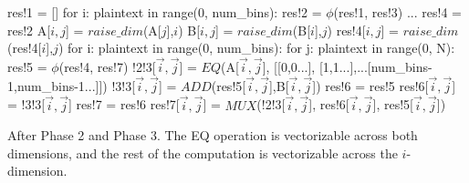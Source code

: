 \documentclass[sigconf, screen, natbib=false, dvipsnames, table]{acmart}
\theoremstyle{definition}
\begin{document}
\begin{algorithmic}
\STATE res!1 = []
\STATE for i: plaintext in range(0, num\_bins):
\STATE \hspace{0.25cm} res!2 = $\phi$(res!1, res!3)
\STATE  \hspace{0.25cm} ...
\STATE res!4 = res!2 
\STATE A[$i,j$] = $\mathit{raise\_dim}$(A[$j$],$i$) 
\STATE B[$i,j$] = $\mathit{raise\_dim}$(B[$i$],$j$) 
\STATE res!4[$i,j$] = $\mathit{raise\_dim}$(res!4[$i$],$j$) 
\STATE for i: plaintext in range(0, num\_bins):
\STATE \hspace{0.25cm}        for j: plaintext in range(0, N):
\STATE \hspace{0.5cm}            res!5 = $\phi$(res!4, res!7) 
\STATE \hspace{0.5cm}            !2!3[$\stackrel{\rightarrow}i,\stackrel{\rightarrow}j$] = $\mathit{EQ}$(A[$\stackrel{\rightarrow}i,\stackrel{\rightarrow}j$], [[0,0...], [1,1...],...[num\_bins-1,num\_bins-1...]])
\STATE \hspace{0.5cm}            !3!3[$\stackrel{\rightarrow}i,\stackrel{\rightarrow}j$] = $\mathit{ADD}$(res!5[$\stackrel{\rightarrow}i,\stackrel{\rightarrow}j$],B[$\stackrel{\rightarrow}i,\stackrel{\rightarrow}j$])
\STATE \hspace{0.5cm}            res!6 = res!5 
\STATE \hspace{0.5cm}            res!6[$\stackrel{\rightarrow}i,\stackrel{\rightarrow}j$] = !3!3[$\stackrel{\rightarrow}i,\stackrel{\rightarrow}j$]
\STATE \hspace{0.5cm}            res!7 = res!6
\STATE \hspace{0.5cm}            res!7[$\stackrel{\rightarrow}i,\stackrel{\rightarrow}j$] = $\mathit{MUX}$(!2!3[$\stackrel{\rightarrow}i,\stackrel{\rightarrow}j$], res!6[$\stackrel{\rightarrow}i,\stackrel{\rightarrow}j$], res!5[$\stackrel{\rightarrow}i,\stackrel{\rightarrow}j$])
\end{algorithmic}

After Phase 2 and Phase 3. The EQ operation is vectorizable across both dimensions, and the rest of the computation is vectorizable across the $i$-dimension.
\end{document}
